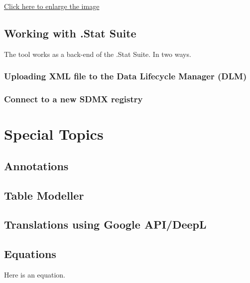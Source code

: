 \documentclass[
]{book}
\theoremstyle{definition}
\theoremstyle{definition}
\theoremstyle{definition}
\theoremstyle{definition}
\theoremstyle{remark}
\begin{document}
\href{images/image186.png}{Click here to enlarge the image}

\hypertarget{working-with-.stat-suite}{%
\section{Working with .Stat Suite}\label{working-with-.stat-suite}}

The tool works as a back-end of the .Stat Suite. In two ways.

\hypertarget{upload-the}{%
\subsection{Uploading XML file to the Data Lifecycle Manager (DLM)}\label{upload-the}}

\hypertarget{connect-to}{%
\subsection{Connect to a new SDMX registry}\label{connect-to}}

\hypertarget{special-topics}{%
\chapter{Special Topics}\label{special-topics}}

\hypertarget{annotations}{%
\section{Annotations}\label{annotations}}

\hypertarget{table-modeller}{%
\section{Table Modeller}\label{table-modeller}}

\hypertarget{translations-using-google-apideepl}{%
\section{Translations using Google API/DeepL}\label{translations-using-google-apideepl}}

\hypertarget{equations}{%
\section{Equations}\label{equations}}

Here is an equation.
\end{document}
